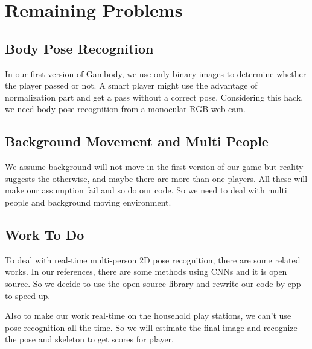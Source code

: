 \documentclass[conference,compsoc]{IEEEtran}
\begin{document}
\section{Remaining Problems}
	\subsection{Body Pose Recognition}
		In our first version of Gambody, we use only binary images to determine whether the player passed or not. 
		A smart player might use the advantage of normalization part and get a pass without a correct pose. 
		Considering this hack, we need body pose recognition from a monocular RGB web-cam.
	\subsection{Background Movement and Multi People}
		We assume background will not move in the first version of our game but reality suggests the otherwise, and maybe there are more than one players. 
		All these will make our assumption fail and so do our code. So we need to deal with multi people and background moving environment.\par
	\subsection{Work To Do}
		To deal with real-time multi-person 2D pose recognition, there are some related works. 
		In our references, there are some methods using CNNs and it is open source. 
		So we decide to use the open source library and rewrite our code by cpp to speed up.\par
		Also to make our work real-time on the household play stations, we can't use pose recognition all the time. So we will estimate the final image and recognize the pose and skeleton to get scores for player.


% 
% 
\end{document}
